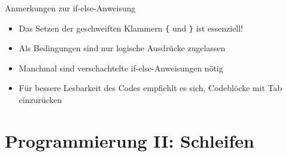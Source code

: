\documentclass[xcolor=dvipsnames, aspectratio = 169]{beamer}
\begin{document}
\begin{frame}[fragile]{Anmerkungen zur if-else-Anweisung}
  \begin{itemize}
    \item Das Setzen der geschweiften Klammern \verb+{+ und \verb+}+ ist essenziell!
    \item Als Bedingungen sind nur logische Ausdrücke zugelassen 
    \item Manchmal sind verschachtelte if-else-Anweisungen nötig
    \item Für bessere Lesbarkeit des Codes empfiehlt es sich, Codeblöcke mit Tab einzurücken
  \end{itemize}
\end{frame}

\section{Programmierung II: Schleifen}
\end{document}
